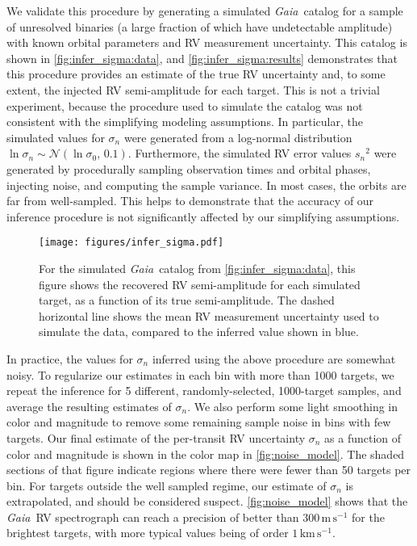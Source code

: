 \documentclass[modern, letterpaper]{aastex631}
\newcommand{\project}[1]{\textsl{#1}}
\newcommand{\Gaia}{\project{Gaia}}
\begin{document}
We validate this procedure by generating a simulated \Gaia\ catalog for a sample of unresolved binaries (a large fraction of which have undetectable amplitude) with known orbital parameters and RV measurement uncertainty.
This catalog is shown in \autoref{fig:infer_sigma:data}, and \autoref{fig:infer_sigma:results} demonstrates that this procedure provides an estimate of the true RV uncertainty and, to some extent, the injected RV semi-amplitude for each target.
This is not a trivial experiment, because the procedure used to simulate the catalog was not consistent with the simplifying modeling assumptions.
In particular, the simulated values for $\sigma_n$ were generated from a log-normal distribution $\ln\sigma_n \sim \mathcal{N}(\ln\sigma_0,\,0.1)$.
Furthermore, the simulated RV error values ${s_n}^2$ were generated by procedurally sampling observation times and orbital phases, injecting noise, and computing the sample variance.
In most cases, the orbits are far from well-sampled.
This helps to demonstrate that the accuracy of our inference procedure is not significantly affected by our simplifying assumptions.

\begin{figure}
	\begin{centering}
		\texttt{[image: figures/infer\_sigma.pdf]}
		\caption{For the simulated \Gaia\ catalog from \autoref{fig:infer_sigma:data}, this figure shows the recovered RV semi-amplitude for each simulated target, as a function of its true semi-amplitude.
			The dashed horizontal line shows the mean RV measurement uncertainty used to simulate the data, compared to the inferred value shown in blue.}
		\label{fig:infer_sigma:results}
	\end{centering}
\end{figure}

In practice, the values for $\sigma_n$ inferred using the above procedure are somewhat noisy.
To regularize our estimates in each bin with more than 1000 targets, we repeat the inference for 5 different, randomly-selected, 1000-target samples, and average the resulting estimates of $\sigma_n$.
We also perform some light smoothing in color and magnitude to remove some remaining sample noise in bins with few targets.
Our final estimate of the per-transit RV uncertainty $\sigma_n$ as a function of color and magnitude is shown in the color map in \autoref{fig:noise_model}.
The shaded sections of that figure indicate regions where there were fewer than 50 targets per bin.
For targets outside the well sampled regime, our estimate of $\sigma_n$ is extrapolated, and should be considered suspect.
\autoref{fig:noise_model} shows that the \Gaia\ RV spectrograph can reach a precision of better than $300\,\mathrm{m\,s^{-1}}$ for the brightest targets, with more typical values being of order $1\,\mathrm{km\,s^{-1}}$.
\end{document}
